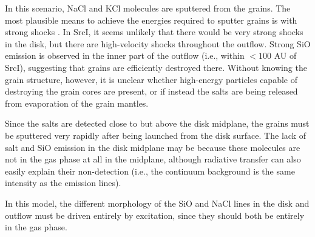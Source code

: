 \documentclass[twocolumn]{aastex62}
\newcommand{\sourcei}{SrcI\xspace}
\begin{document}




In this scenario,  NaCl and KCl molecules are sputtered from the grains.  The
most plausible means to achieve the energies required to sputter grains is with
strong shocks \citep{Schilke1997a}.  In
\sourcei, it seems unlikely that there would be very strong shocks in the disk,
but there are high-velocity shocks throughout the outflow. Strong SiO emission
is observed in the inner part of the outflow (i.e., within $<100$ AU of
\sourcei), suggesting that grains are efficiently destroyed there.
Without knowing the grain structure, however, it is unclear whether high-energy
particles capable of destroying the grain cores are present, or if instead
the salts are being released from evaporation of the grain mantles.

Since the salts are detected close to but above the disk midplane, the
grains must be sputtered very rapidly after being launched from the disk surface.
The lack of salt and SiO emission in the disk midplane may be because these
molecules are not in the gas phase at all in the midplane, although radiative
transfer can also easily explain their non-detection (i.e., the continuum
background is the same intensity as the emission lines).


In this model, the different morphology of the SiO and NaCl lines in the disk
and outflow must be driven entirely by excitation, since they should both be
entirely in the gas phase.  
\end{document}
